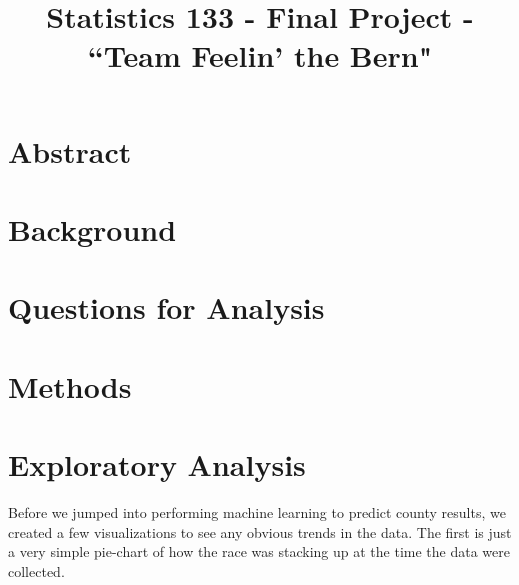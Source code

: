 \documentclass[11pt]{article}
\title{Statistics 133 - Final Project - ``Team Feelin' the Bern"}
\author{\Name}
\date{}
\begin{document}
\maketitle

\section*{Abstract}

\newpage

\section*{Background}

\newpage

\section*{Questions for Analysis}

\newpage

\section*{Methods}

\newpage

\section*{Exploratory Analysis}
Before we jumped into performing machine learning to predict county results, we created a few visualizations to see any obvious trends in the data. The first is just a very simple pie-chart of how the race was stacking up at the time the data were collected. \\
\end{document}
